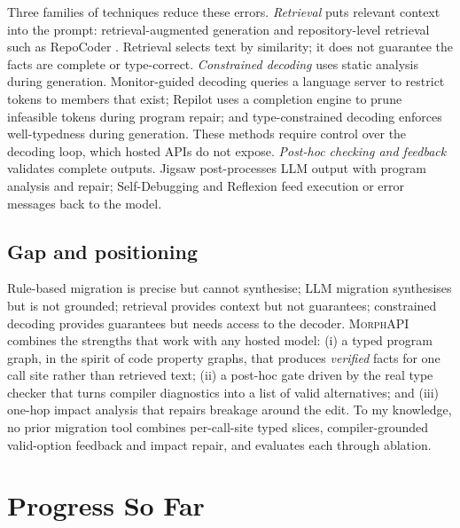 \documentclass[11pt,a4paper]{article}
\newcommand{\morph}{\textsc{MorphAPI}}
\begin{document}
Three families of techniques reduce these errors.
\emph{Retrieval} puts relevant context into the prompt: retrieval-augmented generation
\citep{lewis2020rag} and repository-level retrieval such as RepoCoder
\citep{zhang2023repocoder}. Retrieval selects text by similarity; it does not guarantee
the facts are complete or type-correct.
\emph{Constrained decoding} uses static analysis during generation. Monitor-guided decoding
\citep{agrawal2023monitor} queries a language server to restrict tokens to members that exist;
Repilot \citep{wei2023repilot} uses a completion engine to prune infeasible tokens during
program repair; and type-constrained decoding \citep{mundler2025typeconstrained} enforces
well-typedness during generation. These methods require control over the decoding loop,
which hosted APIs do not expose.
\emph{Post-hoc checking and feedback} validates complete outputs. Jigsaw
\citep{jain2022jigsaw} post-processes LLM output with program analysis and repair;
Self-Debugging \citep{chen2024selfdebug} and Reflexion \citep{shinn2023reflexion} feed
execution or error messages back to the model.

\subsection{Gap and positioning}

Rule-based migration is precise but cannot synthesise; LLM migration synthesises but is not
grounded; retrieval provides context but not guarantees; constrained decoding provides
guarantees but needs access to the decoder. \morph{} combines the strengths that work with
any hosted model: (i) a typed program graph, in the spirit of code property graphs, that
produces \emph{verified} facts for one call site rather than retrieved text; (ii) a post-hoc
gate driven by the real type checker that turns compiler diagnostics into a list of valid
alternatives; and (iii) one-hop impact analysis that repairs breakage around the edit. To my
knowledge, no prior migration tool combines per-call-site typed slices, compiler-grounded
valid-option feedback and impact repair, and evaluates each through ablation.

\section{Progress So Far}
\label{sec:progress}
\end{document}
